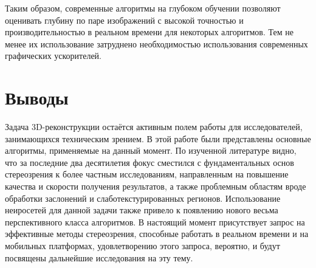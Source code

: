 Таким образом, современные алгоритмы на глубоком обучении позволяют оценивать глубину по паре изображений с высокой точностью и производительностью в реальном времени для некоторых алгоритмов. Тем не менее их использование затруднено 
необходимостью использования современных графических ускорителей. 


\section{Выводы}
\label{conclusion}

Задача 3D-реконструкции остаётся активным полем работы для исследователей, занимающихся техническим зрением. В этой работе были представлены основные алгоритмы, применяемые на данный момент. По изученной литературе видно, что за последние два десятилетия  
фокус сместился с фундаментальных основ стереозрения к более частным исследованиям, направленным на повышение качества и скорости получения результатов, а также проблемным областям вроде обработки заслонений и слаботекстурированных регионов. Использование неиросетей 
для данной задачи также привело к появлению нового весьма перспективного класса алгоритмов. В настоящий момент присутствует запрос на эффективные методы стереозрения, способные работать в реальном времени и на мобильных платформах, удовлетворению 
этого запроса, вероятно, и будут посвящены дальнейшие исследования на эту тему. 



\newpage




